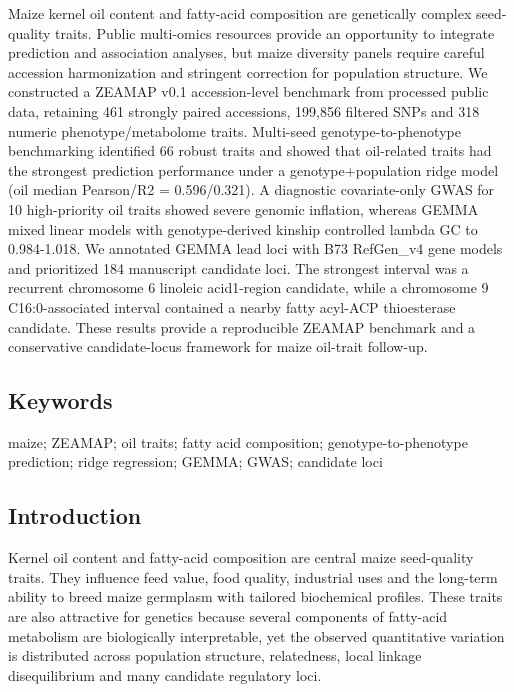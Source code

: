 \documentclass[
]{article}
\begin{document}
Maize kernel oil content and fatty-acid composition are genetically
complex seed-quality traits. Public multi-omics resources provide an
opportunity to integrate prediction and association analyses, but maize
diversity panels require careful accession harmonization and stringent
correction for population structure. We constructed a ZEAMAP v0.1
accession-level benchmark from processed public data, retaining 461
strongly paired accessions, 199,856 filtered SNPs and 318 numeric
phenotype/metabolome traits. Multi-seed genotype-to-phenotype
benchmarking identified 66 robust traits and showed that oil-related
traits had the strongest prediction performance under a
genotype+population ridge model (oil median Pearson/R2 = 0.596/0.321). A
diagnostic covariate-only GWAS for 10 high-priority oil traits showed
severe genomic inflation, whereas GEMMA mixed linear models with
genotype-derived kinship controlled lambda GC to 0.984-1.018. We
annotated GEMMA lead loci with B73 RefGen\_v4 gene models and
prioritized 184 manuscript candidate loci. The strongest interval was a
recurrent chromosome 6 linoleic acid1-region candidate, while a
chromosome 9 C16:0-associated interval contained a nearby fatty acyl-ACP
thioesterase candidate. These results provide a reproducible ZEAMAP
benchmark and a conservative candidate-locus framework for maize
oil-trait follow-up.

\subsection{Keywords}\label{keywords}

maize; ZEAMAP; oil traits; fatty acid composition; genotype-to-phenotype
prediction; ridge regression; GEMMA; GWAS; candidate loci

\subsection{Introduction}\label{introduction}

Kernel oil content and fatty-acid composition are central maize
seed-quality traits. They influence feed value, food quality, industrial
uses and the long-term ability to breed maize germplasm with tailored
biochemical profiles. These traits are also attractive for genetics
because several components of fatty-acid metabolism are biologically
interpretable, yet the observed quantitative variation is distributed
across population structure, relatedness, local linkage disequilibrium
and many candidate regulatory loci.
\end{document}
